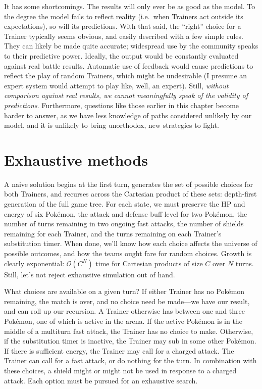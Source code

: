 It has some shortcomings.
The results will only ever be as good as the model.
To the degree the model fails to reflect reality (i.e.\ when Trainers act outside
 its expectations), so will its predictions.
With that said, the ``right'' choice for a Trainer typically seems obvious,
 and easily described with a few simple rules.
They can likely be made quite accurate; widespread use by the community speaks to their predictive power.
Ideally, the output would be constantly evaluated against real battle results.
Automatic use of feedback would cause predictions to reflect the play of random Trainers,
 which might be undesirable (I presume an expert system would attempt to play like, well, an expert).
Still, \textit{without comparison against real results, we cannot meaningfully speak of the validity of predictions}.
Furthermore, questions like those earlier in this chapter become harder to answer,
 as we have less knowledge of paths considered unlikely by our model,
 and it is unlikely to bring unorthodox, new strategies to light.

\section{Exhaustive methods}
\label{sec:exhaustive}
A naive solution begins at the first turn, generates the set of possible
  choices for both Trainers, and recurses across the Cartesian product
  of these sets: depth-first generation of the full game tree.
For each state, we must preserve the HP and energy of six Pokémon,
  the attack and defense buff level for two Pokémon,
  the number of turns remaining in two ongoing fast attacks,
  the number of shields remaining for each Trainer,
  and the turns remaining on each Trainer's substitution timer.
When done, we'll know how each choice affects the universe of possible outcomes,
  and how the teams ought fare for random choices.
Growth is clearly exponential: $\mathcal{O}(C^N)$ time for Cartesian products of size $C$ over $N$ turns.
Still, let's not reject exhaustive simulation out of hand.

What choices are available on a given turn?
If either Trainer has no Pokémon remaining, the match is over, and no choice
  need be made---we have our result, and can roll up our recursion.
A Trainer otherwise has between one and three Pokémon, one of which is active
  in the arena.
If the active Pokémon is in the middle of a multiturn fast attack, the
  Trainer has no choice to make.
Otherwise, if the substitution timer is inactive, the Trainer may sub in some other Pokémon.
If there is sufficient energy, the Trainer may call for a charged attack.
The Trainer can call for a fast attack, or do nothing for the turn.
In combination with these choices, a shield might or might not be used in response to a charged attack.
Each option must be pursued for an exhaustive search.

